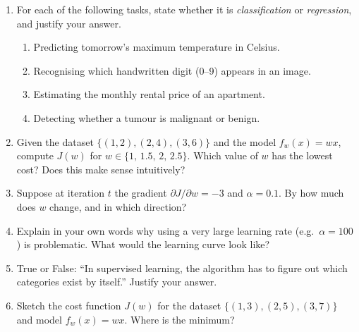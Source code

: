 \begin{enumerate}
\item For each of the following tasks, state whether it is
  \emph{classification} or \emph{regression}, and justify your answer.
  \begin{enumerate}[label=(\alph*)]
  \item Predicting tomorrow's maximum temperature in Celsius.
  \item Recognising which handwritten digit (0--9) appears in an image.
  \item Estimating the monthly rental price of an apartment.
  \item Detecting whether a tumour is malignant or benign.
  \end{enumerate}
\item Given the dataset $\{(1,2),(2,4),(3,6)\}$ and the model $f_w(x)=wx$,
  compute $J(w)$ for $w\in\{1,\,1.5,\,2,\,2.5\}$.
  Which value of $w$ has the lowest cost? Does this make sense intuitively?
\item Suppose at iteration $t$ the gradient $\partial J/\partial w = -3$ and
  $\alpha=0.1$. By how much does $w$ change, and in which direction?
\item Explain in your own words why using a very large learning rate
  (e.g.\ $\alpha=100$) is problematic. What would the learning curve look like?
\item True or False: ``In supervised learning, the algorithm has to figure out
  which categories exist by itself.'' Justify your answer.
\item Sketch the cost function $J(w)$ for the dataset $\{(1,3),(2,5),(3,7)\}$
  and model $f_w(x)=wx$. Where is the minimum?
\end{enumerate}
